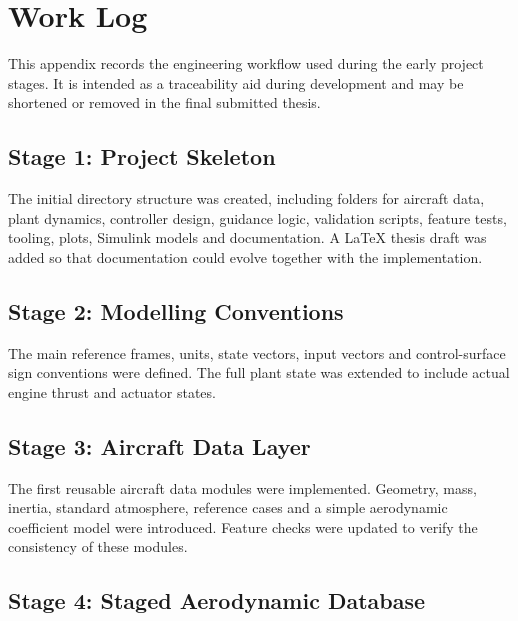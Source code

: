 \chapter{Work Log}

This appendix records the engineering workflow used during the early project stages. It is intended as a traceability aid during development and may be shortened or removed in the final submitted thesis.

\section*{Stage 1: Project Skeleton}

The initial directory structure was created, including folders for aircraft data, plant dynamics, controller design, guidance logic, validation scripts, feature tests, tooling, plots, Simulink models and documentation. A LaTeX thesis draft was added so that documentation could evolve together with the implementation.

\section*{Stage 2: Modelling Conventions}

The main reference frames, units, state vectors, input vectors and control-surface sign conventions were defined. The full plant state was extended to include actual engine thrust and actuator states.

\section*{Stage 3: Aircraft Data Layer}

The first reusable aircraft data modules were implemented. Geometry, mass, inertia, standard atmosphere, reference cases and a simple aerodynamic coefficient model were introduced. Feature checks were updated to verify the consistency of these modules.

\section*{Stage 4: Staged Aerodynamic Database}

